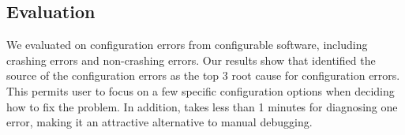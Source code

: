 





 









\subsection{Evaluation}

We evaluated \ourtool on \errors configuration errors
from \subjectnum configurable software, including
\crash crashing errors and \noncrash non-crashing errors.
Our results show that \ourtool identified the source
of the configuration errors as the top 3 root cause
for \topnum configuration errors.
This permits \ourtool user to focus on a few specific configuration
options when deciding how to fix the problem. 
In addition, \ourtool takes less than 1 minutes for diagnosing
one error, making it an attractive alternative
to manual debugging.

